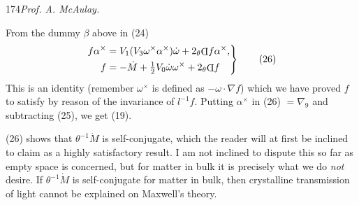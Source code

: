 \documentclass[11pt]{article}
\newcommand{\invd}{\mathord{\vcenter{\hbox{\rotatebox[origin=c]{180}{\(\mathrm{D}\)}}}}}
\newcommand{\thetaPi}{{}_\theta\invd}
\begin{document}
\newpage\thispagestyle{empty}\begin{center}174\hfill \textit{Prof. A. McAulay.}\end{center}
From the dummy $\beta$ above in (24)
\begin{equation}
  \left.\begin{aligned}
    f\alpha^\times&=V_1(V_3\omega^\times\alpha^\times)\dot\omega+2\thetaPi f\alpha^\times,\\
    f&=-\dot M+\tfrac12V_0\dot\omega\omega^\times+2\thetaPi f
  \end{aligned}\right\}
  \tag{26}
\end{equation}
This is an identity (remember $\omega^\times$ is defined as $-\omega\mathbin{\cdot}\nabla f$) which we have proved $f$ to satisfy by reason of the invariance of $l^{-1}f$. Putting $\alpha^\times$ in (26) $=\nabla_9$ and subtracting (25), we get (19).

\indent (26) shows that $\theta^{-1}\dot M$ is self-conjugate, which the reader will at first be inclined to claim as a highly satisfactory result. I am not inclined to dispute this so far as empty space is concerned, but for matter in bulk it is precisely what we do \emph{not} desire. If $\theta^{-1}\dot M$ is self-conjugate for matter in bulk, then crystalline transmission of light cannot be explained on Maxwell's theory.
\end{document}
